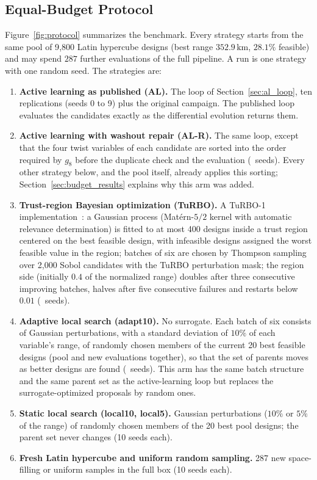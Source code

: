 \subsection{Equal-Budget Protocol}
\label{sec:budget_protocol}
Figure~\ref{fig:protocol} summarizes the benchmark. Every strategy starts from the same pool of 9{,}800 Latin hypercube designs (best range $352.9\,\mathrm{km}$, $28.1\%$ feasible) and may spend $287$ further evaluations of the full pipeline. A run is one strategy with one random seed. The strategies are:
\begin{enumerate}
    \item \textbf{Active learning as published (AL).} The loop of Section~\ref{sec:al_loop}, ten replications (seeds 0 to 9) plus the original campaign. The published loop evaluates the candidates exactly as the differential evolution returns them.
    \item \textbf{Active learning with washout repair (AL-R).} The same loop, except that the four twist variables of each candidate are sorted into the order required by $g_8$ before the duplicate check and the evaluation (\NvNALR\ seeds). Every other strategy below, and the pool itself, already applies this sorting; Section~\ref{sec:budget_results} explains why this arm was added.
    \item \textbf{Trust-region Bayesian optimization (TuRBO).} A TuRBO-1 implementation~\cite{eriksson2019turbo}: a Gaussian process (Mat\'ern-$5/2$ kernel with automatic relevance determination) is fitted to at most 400 designs inside a trust region centered on the best feasible design, with infeasible designs assigned the worst feasible value in the region; batches of six are chosen by Thompson sampling over 2{,}000 Sobol candidates with the TuRBO perturbation mask; the region side (initially $0.4$ of the normalized range) doubles after three consecutive improving batches, halves after five consecutive failures and restarts below $0.01$ (\NvNTurbo\ seeds).
    \item \textbf{Adaptive local search (adapt10).} No surrogate. Each batch of six consists of Gaussian perturbations, with a standard deviation of $10\%$ of each variable's range, of randomly chosen members of the current 20 best feasible designs (pool and new evaluations together), so that the set of parents moves as better designs are found (\NvNAdapt\ seeds). This arm has the same batch structure and the same parent set as the active-learning loop but replaces the surrogate-optimized proposals by random ones.
    \item \textbf{Static local search (local10, local5).} Gaussian perturbations ($10\%$ or $5\%$ of the range) of randomly chosen members of the 20 best pool designs; the parent set never changes (10 seeds each).
    \item \textbf{Fresh Latin hypercube and uniform random sampling.} 287 new space-filling or uniform samples in the full box (10 seeds each).
\end{enumerate}
